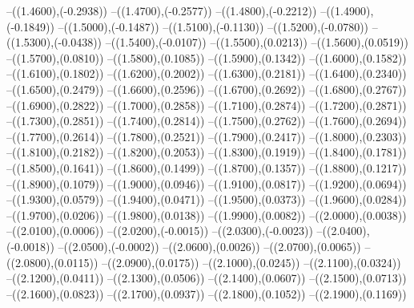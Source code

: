 {	--({\sx*(1.4600)},{\sy*(-0.2938)})
	--({\sx*(1.4700)},{\sy*(-0.2577)})
	--({\sx*(1.4800)},{\sy*(-0.2212)})
	--({\sx*(1.4900)},{\sy*(-0.1849)})
	--({\sx*(1.5000)},{\sy*(-0.1487)})
	--({\sx*(1.5100)},{\sy*(-0.1130)})
	--({\sx*(1.5200)},{\sy*(-0.0780)})
	--({\sx*(1.5300)},{\sy*(-0.0438)})
	--({\sx*(1.5400)},{\sy*(-0.0107)})
	--({\sx*(1.5500)},{\sy*(0.0213)})
	--({\sx*(1.5600)},{\sy*(0.0519)})
	--({\sx*(1.5700)},{\sy*(0.0810)})
	--({\sx*(1.5800)},{\sy*(0.1085)})
	--({\sx*(1.5900)},{\sy*(0.1342)})
	--({\sx*(1.6000)},{\sy*(0.1582)})
	--({\sx*(1.6100)},{\sy*(0.1802)})
	--({\sx*(1.6200)},{\sy*(0.2002)})
	--({\sx*(1.6300)},{\sy*(0.2181)})
	--({\sx*(1.6400)},{\sy*(0.2340)})
	--({\sx*(1.6500)},{\sy*(0.2479)})
	--({\sx*(1.6600)},{\sy*(0.2596)})
	--({\sx*(1.6700)},{\sy*(0.2692)})
	--({\sx*(1.6800)},{\sy*(0.2767)})
	--({\sx*(1.6900)},{\sy*(0.2822)})
	--({\sx*(1.7000)},{\sy*(0.2858)})
	--({\sx*(1.7100)},{\sy*(0.2874)})
	--({\sx*(1.7200)},{\sy*(0.2871)})
	--({\sx*(1.7300)},{\sy*(0.2851)})
	--({\sx*(1.7400)},{\sy*(0.2814)})
	--({\sx*(1.7500)},{\sy*(0.2762)})
	--({\sx*(1.7600)},{\sy*(0.2694)})
	--({\sx*(1.7700)},{\sy*(0.2614)})
	--({\sx*(1.7800)},{\sy*(0.2521)})
	--({\sx*(1.7900)},{\sy*(0.2417)})
	--({\sx*(1.8000)},{\sy*(0.2303)})
	--({\sx*(1.8100)},{\sy*(0.2182)})
	--({\sx*(1.8200)},{\sy*(0.2053)})
	--({\sx*(1.8300)},{\sy*(0.1919)})
	--({\sx*(1.8400)},{\sy*(0.1781)})
	--({\sx*(1.8500)},{\sy*(0.1641)})
	--({\sx*(1.8600)},{\sy*(0.1499)})
	--({\sx*(1.8700)},{\sy*(0.1357)})
	--({\sx*(1.8800)},{\sy*(0.1217)})
	--({\sx*(1.8900)},{\sy*(0.1079)})
	--({\sx*(1.9000)},{\sy*(0.0946)})
	--({\sx*(1.9100)},{\sy*(0.0817)})
	--({\sx*(1.9200)},{\sy*(0.0694)})
	--({\sx*(1.9300)},{\sy*(0.0579)})
	--({\sx*(1.9400)},{\sy*(0.0471)})
	--({\sx*(1.9500)},{\sy*(0.0373)})
	--({\sx*(1.9600)},{\sy*(0.0284)})
	--({\sx*(1.9700)},{\sy*(0.0206)})
	--({\sx*(1.9800)},{\sy*(0.0138)})
	--({\sx*(1.9900)},{\sy*(0.0082)})
	--({\sx*(2.0000)},{\sy*(0.0038)})
	--({\sx*(2.0100)},{\sy*(0.0006)})
	--({\sx*(2.0200)},{\sy*(-0.0015)})
	--({\sx*(2.0300)},{\sy*(-0.0023)})
	--({\sx*(2.0400)},{\sy*(-0.0018)})
	--({\sx*(2.0500)},{\sy*(-0.0002)})
	--({\sx*(2.0600)},{\sy*(0.0026)})
	--({\sx*(2.0700)},{\sy*(0.0065)})
	--({\sx*(2.0800)},{\sy*(0.0115)})
	--({\sx*(2.0900)},{\sy*(0.0175)})
	--({\sx*(2.1000)},{\sy*(0.0245)})
	--({\sx*(2.1100)},{\sy*(0.0324)})
	--({\sx*(2.1200)},{\sy*(0.0411)})
	--({\sx*(2.1300)},{\sy*(0.0506)})
	--({\sx*(2.1400)},{\sy*(0.0607)})
	--({\sx*(2.1500)},{\sy*(0.0713)})
	--({\sx*(2.1600)},{\sy*(0.0823)})
	--({\sx*(2.1700)},{\sy*(0.0937)})
	--({\sx*(2.1800)},{\sy*(0.1052)})
	--({\sx*(2.1900)},{\sy*(0.1169)})
}
